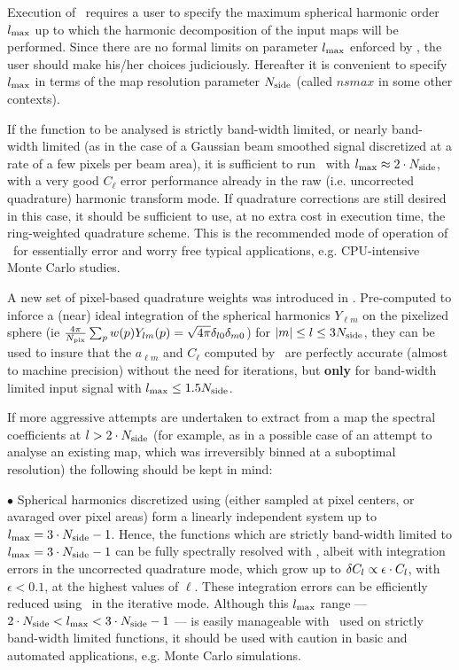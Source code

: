 \begin{recommend}
{Execution of \thedocid\ requires a user to specify the maximum 
spherical harmonic order $l_{\mathrm{max}}$ up to which the harmonic 
decomposition of the input maps will be performed.
Since there are no formal limits on parameter
$l_{\mathrm{max}}$ enforced by \thedocid, the user should make his/her choices
judiciously. 
Hereafter it is convenient to specify $l_{\mathrm{max}}$  
in terms of the \healpix
map resolution parameter $N_{\mathrm{side}}$ (called $nsmax$ in some other contexts).

If the function to be analysed is strictly  band-width
limited, or nearly band-width limited (as in the case of 
a Gaussian beam smoothed signal discretized at a rate of a few pixels
per beam area), it is  sufficient to run \thedocid\ with
$l_{\mathrm{max}} \approx 2\cdot N_{\mathrm{side}}$, with a very good $C_\ell$ 
error performance 
already in the raw (i.e. uncorrected quadrature) harmonic transform mode. 
If quadrature 
corrections are still desired in this case, it should be sufficient to use, at no
extra cost in execution time, the ring-weighted quadrature scheme. 
This is the recommended mode of operation of \thedocid\ for essentially
error and worry free typical applications, e.g. CPU-intensive 
Monte Carlo studies. 

A new set of pixel-based quadrature weights was introduced in .
Pre-computed to inforce a (near) ideal integration of the spherical harmonics $Y_{\ell m}$ on the pixelized sphere (ie $\frac{4\pi}{N_{\mathrm{pix}}} \sum_p w(p) Y_{l m}(p) = \sqrt{4 \pi} \delta_{l 0}\delta_{m 0}$)
for $|m| \le l \le 3 N_{\mathrm{side}}$, they can be used to insure that the $a_{\ell m}$ and $C_\ell$ computed by \thedocid\
are perfectly accurate (almost to machine precision) without the need for iterations, 
but \textbf{only} for band-width 
limited input signal with $l_{\mathrm{max}} \le 1.5 N_{\mathrm{side}}$.

If more aggressive attempts are undertaken to extract from a map 
the spectral coefficients at $l > 2\cdot N_{\mathrm{side}}$ (for example, as 
in a possible case of an attempt to analyse an existing map, which was 
irreversibly binned  at a suboptimal resolution) 
the following should be kept in mind:

$\bullet$ Spherical harmonics discretized using \healpix 
(either sampled at
pixel centers, or avaraged over pixel areas) form a linearly independent
system up to $l_{\mathrm{max}} = 3 \cdot N_{\mathrm{side}} -1$. Hence, the functions which are
strictly band-width limited to $l_{\mathrm{max}} = 3 \cdot N_{\mathrm{side}} - 1 $ 
can be fully
spectrally resolved with \thedocid, albeit with integration errors
in the uncorrected quadrature mode, which grow up to 
$\delta C_l \propto \epsilon \cdot C_l$, with $\epsilon <0.1$, 
at the highest values of $\ell$. These integration  errors 
can be efficiently 
reduced
using \thedocid\ in the iterative mode. Although this $l_{\mathrm{max}}$ range
--- $2 \cdot N_{\mathrm{side}} < l_{\mathrm{max}} < 3 \cdot N_{\mathrm{side}} - 1$ --- is easily
manageable with \thedocid\ used on strictly band-width limited functions,
it should be used with caution in basic and automated applications, e.g.
Monte Carlo simulations.

}
\end{recommend}
